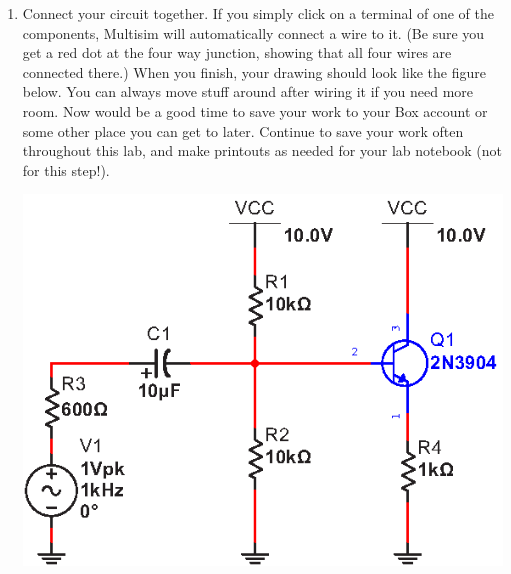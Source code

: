 \begin{enumerate}[wide]
\pagebreak[2]
\item Connect your circuit together.  If you simply click on a terminal of one of the components, Multisim will automatically connect a wire to it.  (Be sure you get a red dot at the four way junction, showing that all four wires are connected there.)  When you finish, your drawing should look like the figure below.  You can always move stuff around after wiring it if you need more room.  Now would be a good time to save your work to your Box account or some other place you can get to later.  Continue to save your work often throughout this lab, and make printouts as needed for your lab notebook (not for this step!).
\begin{center}
\includegraphics{multisim/wired.eps}
\end{center}


\end{enumerate}
